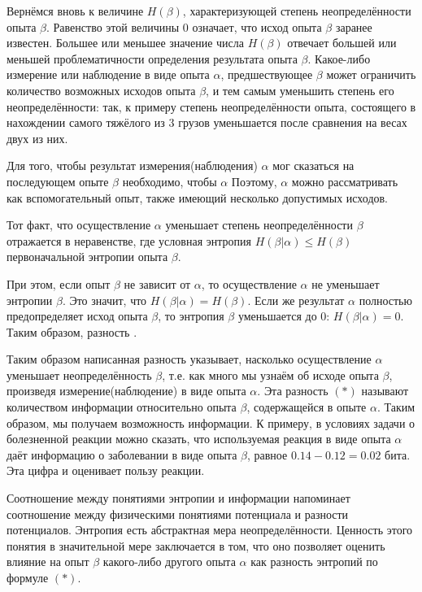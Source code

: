 \documentclass[a4paper,12pt]{report}
\begin{document}
	Вернёмся вновь к величине $H(\beta)$, характеризующей степень неопределённости опыта $\beta$. Равенство этой величины $0$ означает, что исход опыта $\beta$ заранее известен. Большее или меньшее значение числа $H(\beta)$ отвечает большей или меньшей проблематичности определения результата опыта $\beta$. Какое-либо измерение или наблюдение в виде опыта $\alpha$, предшествующее $\beta$ может ограничить количество возможных исходов опыта $\beta$, и тем самым уменьшить степень его неопределённости: так, к примеру степень неопределённости опыта, состоящего в нахождении самого тяжёлого из $3$ грузов уменьшается после сравнения на весах двух из них. 

	Для того, чтобы результат измерения(наблюдения) $\alpha$ мог сказаться на последующем опыте $\beta$ необходимо, чтобы $\alpha$  Поэтому, $\alpha$ можно рассматривать как вспомогательный опыт, также имеющий несколько допустимых исходов. 
	
	Тот факт, что осуществление $\alpha$ уменьшает степень неопределённости $\beta$ отражается в неравенстве, где условная энтропия $H(\beta|\alpha) \le H(\beta)$ первоначальной энтропии опыта $\beta$.


	При этом, если опыт $\beta$ не зависит от $\alpha$, то осуществление $\alpha$ не уменьшает энтропии $\beta$. Это значит, что $H(\beta|\alpha) = H(\beta)$. Если же результат $\alpha$ полностью предопределяет исход опыта $\beta$, то энтропия $\beta$ уменьшается до $0$: $H(\beta|\alpha) = 0$. Таким образом, разность .

	Таким образом написанная разность указывает, насколько осуществление $\alpha$ уменьшает неопределённость $\beta$, т.е. как много мы узнаём об исходе опыта $\beta$, произведя измерение(наблюдение) в виде опыта $\alpha$. Эта разность $(*)$ называют количеством информации относительно опыта $\beta$, содержащейся в опыте $\alpha$. Таким образом, мы получаем возможность  информации. К примеру, в условиях задачи о болезненной реакции можно сказать, что используемая реакция в виде опыта $\alpha$ даёт информацию о заболевании в виде опыта $\beta$, равное $0.14-0.12 = 0.02$ бита. Эта цифра и оценивает пользу реакции.
	
	Соотношение между понятиями энтропии и информации напоминает соотношение между физическими понятиями потенциала и разности потенциалов. Энтропия есть абстрактная мера неопределённости. Ценность этого понятия в значительной мере заключается в том, что оно позволяет оценить влияние на опыт $\beta$ какого-либо другого опыта $\alpha$ как разность энтропий по формуле $(*)$.
	
\end{document}
